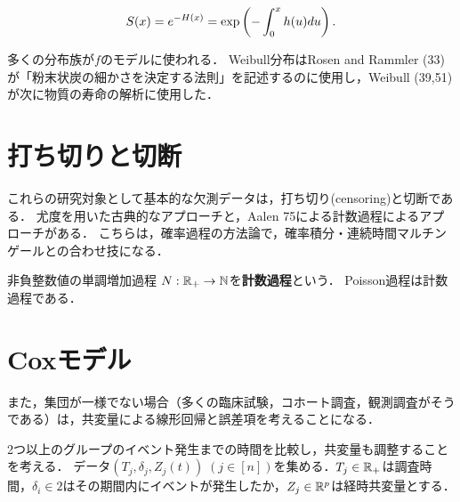 \documentclass[uplatex,dvipdfmx]{jsreport}
\begin{document}
\begin{proposition}
    \[S(x)=e^{-H(x)}=\exp\left(-\int^x_0h(u)du\right).\]
\end{proposition}

\begin{remarks}
    多くの分布族が$f$のモデルに使われる．
    Weibull分布はRosen and Rammler (33)が「粉末状炭の細かさを決定する法則」を記述するのに使用し，Weibull (39,51)が次に物質の寿命の解析に使用した．
\end{remarks}

\section{打ち切りと切断}

\begin{tcolorbox}[colframe=ForestGreen, colback=ForestGreen!10!white,breakable,colbacktitle=ForestGreen!40!white,coltitle=black,fonttitle=\bfseries\sffamily,
title=]
    これらの研究対象として基本的な欠測データは，打ち切り(censoring)と切断である．
    尤度を用いた古典的なアプローチと，Aalen 75による計数過程によるアプローチがある．
    こちらは，確率過程の方法論で，確率積分・連続時間マルチンゲールとの合わせ技になる．
\end{tcolorbox}

\begin{definition}
    非負整数値の単調増加過程
    $N:\mathbb{R}_+\to\mathbb{N}$を\textbf{計数過程}という．
    Poisson過程は計数過程である．
\end{definition}


\section{Coxモデル}

\begin{tcolorbox}[colframe=ForestGreen, colback=ForestGreen!10!white,breakable,colbacktitle=ForestGreen!40!white,coltitle=black,fonttitle=\bfseries\sffamily,
title=]
また，集団が一様でない場合（多くの臨床試験，コホート調査，観測調査がそうである）は，共変量による線形回帰と誤差項を考えることになる．
\end{tcolorbox}

\begin{notation}
    2つ以上のグループのイベント発生までの時間を比較し，共変量も調整することを考える．
    データ$(T_j,\delta_j,Z_j(t))\;(j\in[n])$を集める．$T_j\in\mathbb{R}_+$は調査時間，$\delta_i\in 2$はその期間内にイベントが発生したか，$Z_j\in\mathbb{R}^p$は経時共変量とする．
\end{notation}
\end{document}
